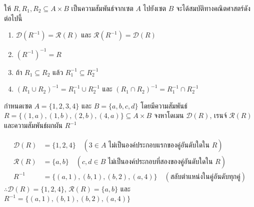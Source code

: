 \begin{prop}
\label{prop:inverse-relation-properties}
ให้ $R, R_1, R_2 \subseteq A \times B$ เป็นความสัมพันธ์จากเซต $A$ ไปยังเซต $B$ จะได้สมบัติทางคณิตศาสตร์ดังต่อไปนี้
\begin{enumerate}[label=\textbf{\arabic*.}]
    \item $\mathcal{D}(R^{-1}) = \mathcal{R}(R)$ และ $\mathcal{R}(R^{-1}) = \mathcal{D}(R)$
    \item $(R^{-1})^{-1} = R$
    \item ถ้า $R_1 \subseteq R_2$ แล้ว $R_1^{-1} \subseteq R_2^{-1}$
    \item $(R_1 \cup R_2)^{-1} = R_1^{-1} \cup R_2^{-1}$ และ $(R_1 \cap R_2)^{-1} = R_1^{-1} \cap R_2^{-1}$
\end{enumerate}
\end{prop}

\begin{ex}
\label{ex:domain-range-inverse-basic}
กำหนดเซต $A = \{1, 2, 3, 4\}$ และ $B = \{a, b, c, d\}$ โดยมีความสัมพันธ์ $R = \{(1,a), (1,b), (2,b), (4,a)\} \subseteq A \times B$ จงหาโดเมน $\mathcal{D}(R)$, เรนจ์ $\mathcal{R}(R)$ และความสัมพันธ์ผกผัน $R^{-1}$
\end{ex}
\begin{solution}
\begin{align*}
\mathcal{D}(R) &= \{1,2,4\} \quad (3 \in A \text{ ไม่เป็นองค์ประกอบแรกของคู่อันดับใดใน } R)\\
\mathcal{R}(R) &= \{a,b\} \quad (c, d \in B \text{ ไม่เป็นองค์ประกอบที่สองของคู่อันดับใดใน } R)\\
R^{-1} &= \{(a,1),(b,1),(b,2),(a,4)\} \quad (\text{สลับตำแหน่งในคู่อันดับทุกคู่})
\end{align*}
$\therefore \mathcal{D}(R) = \{1,2,4\}$, $\mathcal{R}(R) = \{a,b\}$ และ $R^{-1} = \{(a,1),(b,1),(b,2),(a,4)\}$ \solhere
\end{solution}

